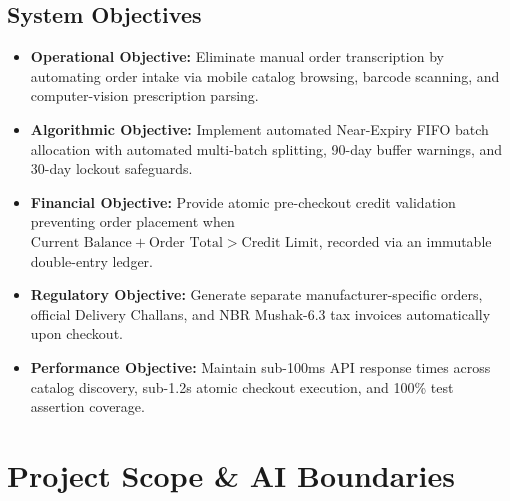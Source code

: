 \documentclass[10pt,a4paper]{article}
\begin{document}
\subsection{System Objectives}
\begin{itemize}[leftmargin=*]
    \item \textbf{Operational Objective:} Eliminate manual order transcription by automating order intake via mobile catalog browsing, barcode scanning, and computer-vision prescription parsing.
    \item \textbf{Algorithmic Objective:} Implement automated Near-Expiry FIFO batch allocation with automated multi-batch splitting, 90-day buffer warnings, and 30-day lockout safeguards.
    \item \textbf{Financial Objective:} Provide atomic pre-checkout credit validation preventing order placement when $\text{Current Balance} + \text{Order Total} > \text{Credit Limit}$, recorded via an immutable double-entry ledger.
    \item \textbf{Regulatory Objective:} Generate separate manufacturer-specific orders, official Delivery Challans, and NBR Mushak-6.3 tax invoices automatically upon checkout.
    \item \textbf{Performance Objective:} Maintain sub-100ms API response times across catalog discovery, sub-1.2s atomic checkout execution, and 100\% test assertion coverage.
\end{itemize}

\section{Project Scope \& AI Boundaries}
\end{document}
